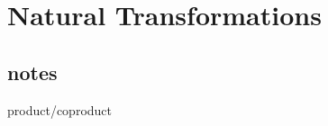 \documentclass[DaoFP]{subfiles}
\begin{document}
\setcounter{chapter}{8}

\chapter{Natural Transformations}

\section{notes}

product/coproduct



\begin{exercise}
\end{exercise}
\begin{haskell}
\end{haskell}
\[
 \begin{tikzcd}
  \end{tikzcd}
\]
\end{document}
